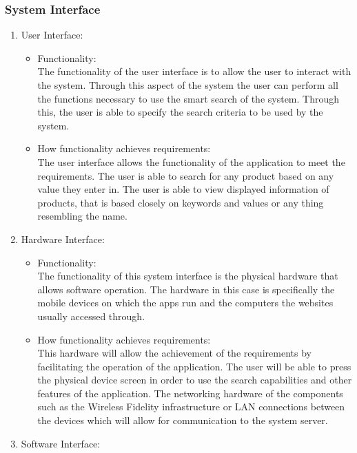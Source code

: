 \documentclass[a4paper,10pt]{article}
\begin{document}
        \subsubsection{System Interface}{
			\begin{enumerate} 
				\item User Interface:
					\begin{itemize}
				\item Functionality:\\
					The functionality of the user interface is to allow the user to interact with the system. Through this aspect of the system the user can perform all the functions necessary to use the smart search of the system. Through this, the user is able to specify the search criteria to be used by the system.\\
				\item How functionality achieves requirements:\\	
					The user interface allows the functionality of the application to meet the requirements. The user is able to search for any product based on any value they enter in. The user is able to view displayed information of products, that is based closely on keywords and values or any thing resembling the name. \\
					\end{itemize}
				\item Hardware Interface:
					\begin{itemize}
					\item Functionality:\\
					The functionality of this system interface is the physical hardware that allows software operation. The hardware in this case is specifically the mobile devices on which the apps run and the computers the websites usually accessed through.\\
				\item How functionality achieves requirements:\\
					This hardware will allow the achievement of the requirements by facilitating the operation of the application. The user will be able to press the physical device screen in order to use the search capabilities and other features of the application. The networking hardware of the components such as the Wireless Fidelity infrastructure or LAN connections between the devices which will allow for communication to the system server.
				\end{itemize}
				\item Software Interface:

\end{enumerate}}
\end{document}
